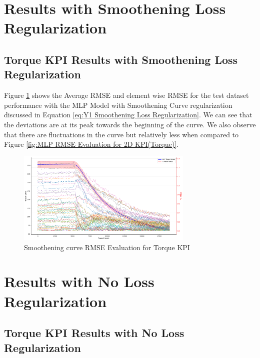 \documentclass{report} %
\begin{document}
\section{Results with Smoothening Loss Regularization}\label{sec:Results with Smoothening Loss Regularization}

\subsection{Torque \ac{KPI} Results with Smoothening Loss Regularization}\label{subsec:2D Torque Results with Smoothening Loss Regularization}

Figure \ref{fig:Smoothening Torque RMSE Evaluation for 2D KPI(Torque)} shows the Average \ac{RMSE} and element wise \ac{RMSE} for the test dataset performance 
with the MLP Model with Smoothening Curve regularization discussed in Equation \ref{eq:Y1 Smoothening Loss Regularization}.
We can see that the deviations are at its peak towards the beginning of the curve. 
We also observe that there are fluctuations in the curve but relatively less when compared to Figure \ref{fig:MLP RMSE Evaluation for 2D KPI(Torque)}.
\begin{figure}[H]
    \centering
    \includegraphics[width=0.75\textwidth]{./ReportImages/RMSE_MLP_Smoothening_y1.png} 
    \caption{Smoothening curve \ac{RMSE} Evaluation for Torque \ac{KPI}} 
    \label{fig:Smoothening Torque RMSE Evaluation for 2D KPI(Torque)}
\end{figure}

\section{Results with No Loss Regularization}\label{sec:Results with No Loss Regularization}
\subsection{Torque \ac{KPI} Results with No Loss Regularization}\label{subsec:2D Torque Results with No Loss Regularization}
\end{document}
